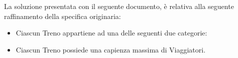 La soluzione presentata con il seguente documento, è relativa alla seguente raffinamento della specifica originaria:
	\begin{itemize}
		\item Ciascun Treno appartiene ad una delle seguenti due categorie:
		\item Ciascun Treno possiede una capienza massima di Viaggiatori.
	\end{itemize}
